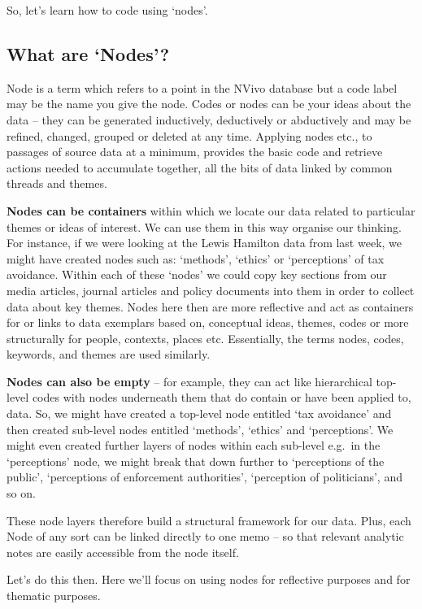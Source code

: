 \documentclass[]{book}
\theoremstyle{definition}
\theoremstyle{definition}
\theoremstyle{definition}
\theoremstyle{remark}
\begin{document}
So, let's learn how to code using `nodes'.

\hypertarget{what-are-nodes}{%
\subsection{What are `Nodes'?}\label{what-are-nodes}}

Node is a term which refers to a point in the NVivo database but a code
label may be the name you give the node. Codes or nodes can be your
ideas about the data -- they can be generated inductively, deductively
or abductively and may be refined, changed, grouped or deleted at any
time. Applying nodes etc., to passages of source data at a minimum,
provides the basic code and retrieve actions needed to accumulate
together, all the bits of data linked by common threads and themes.

\textbf{Nodes can be containers} within which we locate our data related
to particular themes or ideas of interest. We can use them in this way
organise our thinking. For instance, if we were looking at the Lewis
Hamilton data from last week, we might have created nodes such as:
`methods', `ethics' or `perceptions' of tax avoidance. Within each of
these `nodes' we could copy key sections from our media articles,
journal articles and policy documents into them in order to collect data
about key themes. Nodes here then are more reflective and act as
containers for or links to data exemplars based on, conceptual ideas,
themes, codes or more structurally for people, contexts, places etc.
Essentially, the terms nodes, codes, keywords, and themes are used
similarly.

\textbf{Nodes can also be empty} -- for example, they can act like
hierarchical top-level codes with nodes underneath them that do contain
or have been applied to, data. So, we might have created a top-level
node entitled `tax avoidance' and then created sub-level nodes entitled
`methods', `ethics' and `perceptions'. We might even created further
layers of nodes within each sub-level e.g.~in the `perceptions' node, we
might break that down further to `perceptions of the public',
`perceptions of enforcement authorities', `perception of politicians',
and so on.

These node layers therefore build a structural framework for our data.
Plus, each Node of any sort can be linked directly to one memo -- so
that relevant analytic notes are easily accessible from the node itself.

Let's do this then. Here we'll focus on using nodes for reflective
purposes and for thematic purposes.
\end{document}
